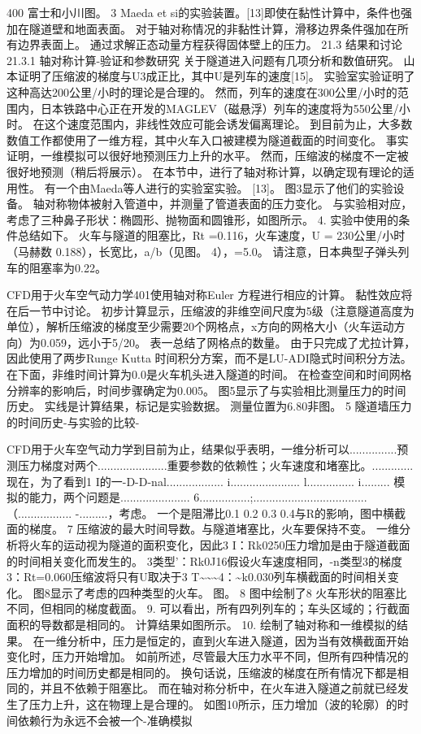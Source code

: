 \documentclass[UTF8,11pt,a4paper,openany,fontset=fandol]{ctexbook}
\begin{document}
400 富士和小川图。 3 Maeda et si的实验装置。[13]即使在黏性计算中，条件也强加在隧道壁和地面表面。 对于轴对称情况的非黏性计算，滑移边界条件强加在所有边界表面上。 通过求解正态动量方程获得固体壁上的压力。 21.3 结果和讨论 21.3.1 轴对称计算-验证和参数研究 关于隧道进入问题有几项分析和数值研究。 山本证明了压缩波的梯度与U3成正比，其中U是列车的速度[15]。 实验室实验证明了这种高达200公里/小时的理论是合理的。 然而，列车的速度在300公里/小时的范围内，日本铁路中心正在开发的MAGLEV（磁悬浮）列车的速度将为550公里/小时。 在这个速度范围内，非线性效应可能会诱发偏离理论。 到目前为止，大多数数值工作都使用了一维方程，其中火车入口被建模为隧道截面的时间变化。 事实证明，一维模拟可以很好地预测压力上升的水平。 然而，压缩波的梯度不一定被很好地预测（稍后将展示）。 在本节中，进行了轴对称计算，以确定现有理论的适用性。 有一个由Maeda等人进行的实验室实验。 [13]。 图3显示了他们的实验设备。 轴对称物体被射入管道中，并测量了管道表面的压力变化。 与实验相对应，考虑了三种鼻子形状：椭圆形、抛物面和圆锥形，如图所示。 4. 实验中使用的条件总结如下。 火车与隧道的阻塞比，Rt =0.116，火车速度，U = 230公里/小时（马赫数 0.188），长宽比，a/b（见图。 4），=5.0。 请注意，日本典型子弹头列车的阻塞率为0.22。

CFD用于火车空气动力学401使用轴对称Euler 方程进行相应的计算。 黏性效应将在后一节中讨论。 初步计算显示，压缩波的非维空间尺度为5级（注意隧道高度为单位），解析压缩波的梯度至少需要20个网格点，x方向的网格大小（火车运动方向）为0.059，远小于5/20。 表一总结了网格点的数量。 由于只完成了尤拉计算，因此使用了两步Runge Kutta 时间积分方案，而不是LU-ADI隐式时间积分方法。 在下面，非维时间计算为0.0是火车机头进入隧道的时间。 在检查空间和时间网格分辨率的影响后，时间步骤确定为0.005。 图5显示了与实验相比测量压力的时间历史。 实线是计算结果，标记是实验数据。 测量位置为6.80非图。 5 隧道墙压力的时间历史-与实验的比较-

CFD用于火车空气动力学到目前为止，结果似乎表明，一维分析可以...............预测压力梯度对两个......................重要参数的依赖性；火车速度和堵塞比。............. 现在，为了看到1 I的一-D-D-nal.................. i...................... l............... i......... 模拟的能力，两个问题是...................... 6................;.................................... （................. -.........，考虑。 一个是阻滞比0.1 0.2 0.3 0.4与R的影响，图中横截面的梯度。 7 压缩波的最大时间导数。与隧道堵塞比，火车要保持不变。 一维分析将火车的运动视为隧道的面积变化，因此3 I：Rk0250压力增加是由于隧道截面的时间相关变化而发生的。 3类型'：Rk0J16假设火车速度相同，-n类型3的梯度3：Rt=0.060压缩波将只有U取决于3 T\textasciitilde{}\textasciitilde{}\textasciitilde{}4：\textasciitilde{}k0.030列车横截面的时间相关变化。 图8显示了考虑的四种类型的火车。 图。 8 图中绘制了8 火车形状的阻塞比不同，但相同的梯度截面。 9. 可以看出，所有四列列车的；车头区域的；行截面面积的导数都是相同的。 计算结果如图所示。 10. 绘制了轴对称和一维模拟的结果。 在一维分析中，压力是恒定的，直到火车进入隧道，因为当有效横截面开始变化时，压力开始增加。 如前所述，尽管最大压力水平不同，但所有四种情况的压力增加的时间历史都是相同的。 换句话说，压缩波的梯度在所有情况下都是相同的，并且不依赖于阻塞比。 而在轴对称分析中，在火车进入隧道之前就已经发生了压力上升，这在物理上是合理的。 如图10所示，压力增加（波的轮廓）的时间依赖行为永远不会被一个-准确模拟
\end{document}
